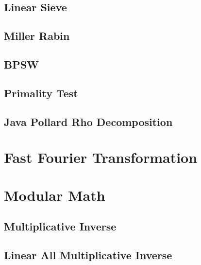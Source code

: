 \documentclass[10pt,a4paper]{report}
\begin{document}
		\subsection{Linear Sieve}
			
		\newpage
		\subsection{Miller Rabin}
			
		\newpage
		\subsection{BPSW}
			
		\newpage
		\subsection{Primality Test}
			
		\newpage
		\subsection{Java Pollard Rho Decomposition}
			
		
	
	\newpage
	\section{Fast Fourier Transformation}
		
	
	\newpage
	\section{Modular Math}
		\subsection{Multiplicative Inverse}
			
		\subsection{Linear All Multiplicative Inverse}
			
		\newpage
\end{document}
